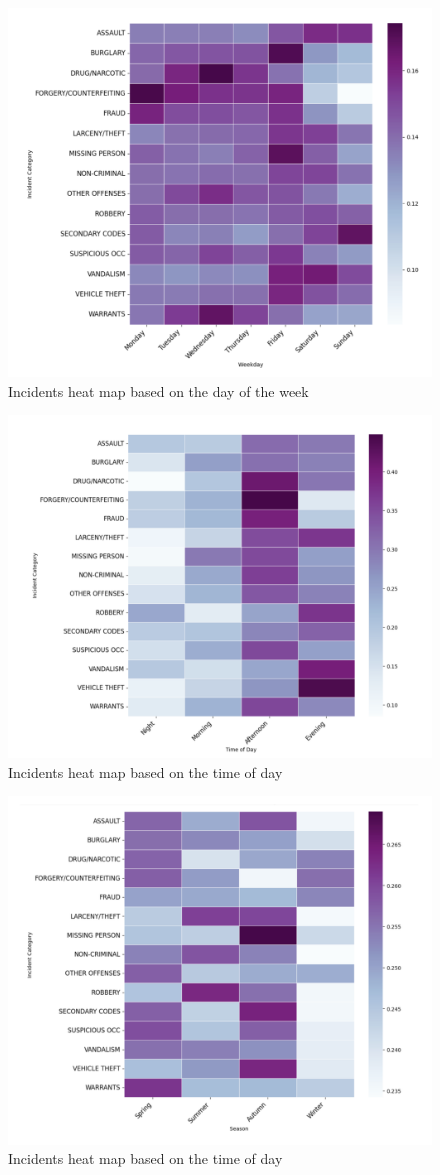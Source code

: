\documentclass[conference,final,]{IEEEtran}
\begin{document}
\begin{figure}

{\centering \includegraphics[width=0.5\linewidth]{img/fig5} 

}

\caption{Incidents heat map based on the day of the week}\label{fig:unnamed-chunk-5}
\end{figure}

\begin{figure}

{\centering \includegraphics[width=0.5\linewidth]{img/fig6} 

}

\caption{Incidents heat map based on the time of day}\label{fig:unnamed-chunk-6}
\end{figure}

\begin{figure}

{\centering \includegraphics[width=0.5\linewidth]{img/fig7} 

}

\caption{Incidents heat map based on the time of day}\label{fig:unnamed-chunk-7}
\end{figure}
\end{document}
